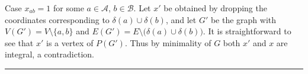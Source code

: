 \documentclass[preprint]{elsarticle}
\newenvironment{proof}{{\bf Proof:  }}{\hfill\rule{2mm}{2mm}}
\begin{document}
\begin{proof}
Case $x_{ab}=1$ for some $a\in \mathcal{A}$, $b\in\mathcal{B}$. Let
$x'$ be obtained by dropping the coordinates corresponding to
$\delta(a)\cup\delta(b)$, and let $G'$ be the graph with
$V(G')=V\setminus\{a,b\}$ and
$E(G') = E \setminus \big(\delta(a)\cup\delta(b)\big)$. It is
straightforward to see that $x'$ is a vertex of $P(G')$. Thus by
minimality of $G$ both $x'$ and $x$ are integral, a contradiction.
\end{proof}




\end{document}
